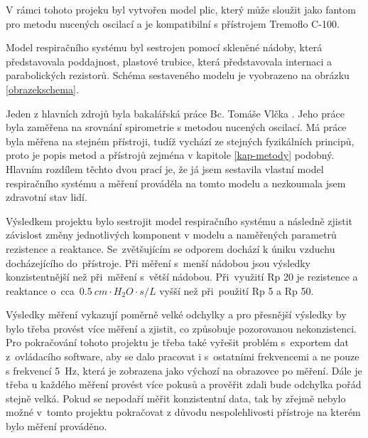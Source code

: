 V rámci tohoto projeku byl vytvořen model plic, který může sloužit jako fantom pro metodu nucených oscilací a je kompatibilní s přístrojem Tremoflo C-100. 

Model respiračního systému byl sestrojen pomocí skleněné nádoby, která představovala poddajnost, plastové trubice, která představovala internaci a parabolických rezistorů.  Schéma sestaveného modelu je vyobrazeno na obrázku \ref{obrazekschema}. 


Jeden z hlavních zdrojů byla bakalářská práce Bc. Tomáše Vlčka \cite{Vlcek2018}. Jeho práce byla zaměřena na srovnání spirometrie s metodou nucených oscilací. Má práce byla měřena na stejném přístroji, tudíž vychází ze stejných fyzikálních principů, proto je popis metod a přístrojů zejména v kapitole \ref{kap-metody} podobný. Hlavním rozdílem těchto dvou prací je, že já jsem sestavila vlastní model respiračního systému a měření prováděla na tomto modelu a nezkoumala jsem zdravotní stav lidí. 


Výsledkem projektu bylo sestrojit model respiračního systému a následně zjistit závislost změny jednotlivých komponent v modelu a naměřených parametrů rezistence a reaktance. Se~zvětšujícím se odporem dochází k úniku vzduchu docházejícího do~přístroje. Při měření s~menší nádobou jsou výsledky konzistentnější než při~měření s~větší nádobou. Při~využití Rp 20 je rezistence a reaktance o~cca~$\SI{0,5}{cm \cdot H_{2}O \cdot s/L}$ vyšší než při~použití Rp 5 a Rp 50. 


Výsledky měření vykazují poměrně velké odchylky a pro přesnější výsledky by bylo třeba provést více měření a zjistit, co způsobuje pozorovanou nekonzistenci. Pro pokračování tohoto projektu je třeba také vyřešit problém s~exportem dat z~ovládacího software, aby se dalo pracovat i s~ostatními frekvencemi a ne pouze s frekvencí \SI{5}{Hz}, která je zobrazena jako výchozí na obrazovce po měření. Dále je třeba u každého měření provést více pokusů a prověřit zdali bude odchylka pořád stejně velká. 
Pokud se nepodaří měřit konzistentní data, tak by zřejmě nebylo možné v~tomto projektu pokračovat z důvodu nespolehlivosti přístroje na kterém bylo měření prováděno. 
